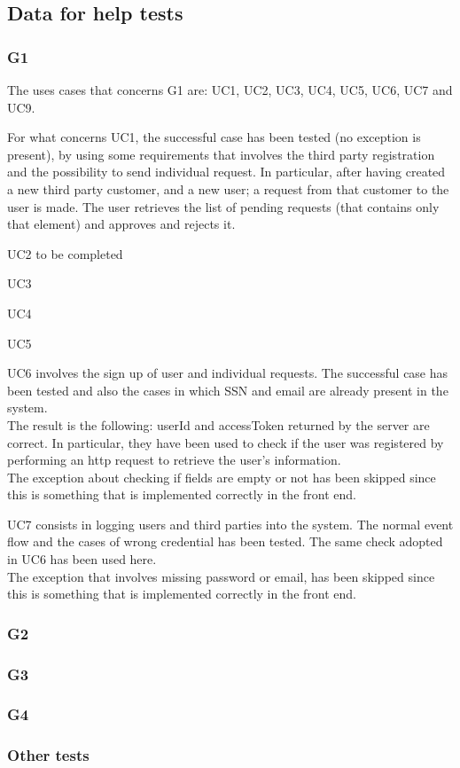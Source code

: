 \subsection{Data for help tests}
\subsubsection{G1}
The uses cases that concerns G1 are: UC1, UC2, UC3, UC4, UC5, UC6, UC7 and UC9.  \\

\par 
For what concerns UC1, the successful case has been tested (no exception is present), by using some requirements that involves the
third party registration and the possibility to send individual request. In particular, after having created a new third party customer,
and a new user; a request from that customer to the user is made. The user retrieves the list of pending requests (that contains only that
element) and approves and rejects it.

\par 
UC2 to be completed

\par 
UC3

\par 
UC4

\par 
UC5

\par 
UC6 involves the sign up of user and individual requests. The successful case has been tested and also the cases in which SSN and email
are already present in the system. \\
The result is the following: userId and accessToken returned by the server are correct. In particular, they have been used to check
if the user was registered by performing an http request to retrieve the user's information.  \\
The exception about checking if fields are empty or not has been skipped since this is something that is implemented correctly in the front
end.

\par 
UC7 consists in logging users and third parties into the system. The normal event flow and the cases of wrong credential has been tested.
The same check adopted in UC6 has been used here. \\ 
The exception that involves missing password or email, has been skipped since this is something that is implemented correctly in the front 
end.



\subsubsection{G2}

\subsubsection{G3}

\subsubsection{G4}

\subsubsection{Other tests}
